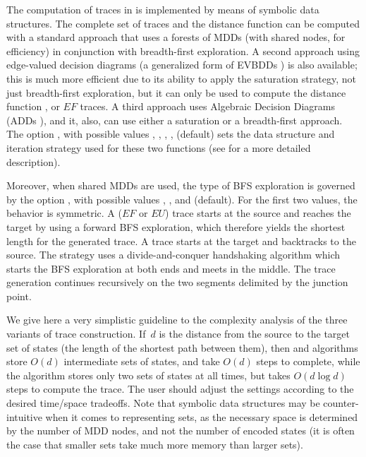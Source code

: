 \begin{developer}
The computation of traces in {\smart} is implemented by means of symbolic
data structures.
The complete set of traces and the distance function can
be computed with a standard approach that uses a forests of MDDs (with
shared nodes, for efficiency) in conjunction with breadth-first exploration.
A second approach using edge-valued decision diagrams (a generalized form
of EVBDDs \cite{Lai1996EVBDDs}) is also available;
this is much more efficient due to its ability to apply the saturation
strategy, not just breadth-first exploration, but it can only be used to
compute the distance function , or $EF$ traces.
A third approach uses Algebraic Decision Diagrams (ADDs \cite{Bahar1997ADDs}),
and it, also, can use either a saturation or a breadth-first approach.
The option , with possible
values , , ,
,  (default) sets the data structure and
iteration strategy used for these two functions
(see \cite{2002FMCAD-EVMDD} for a more detailed description).

Moreover, when shared MDDs are used, the type of BFS exploration is
governed by the option , with possible values
, , and  (default).
For the first two values, the behavior is symmetric.
A  ($EF$ or $EU$) trace starts at the source and reaches the
target by using a forward BFS exploration, which therefore yields the
shortest length for the generated trace.
A  trace starts at the target and backtracks to the source.
The  strategy uses a divide-and-conquer handshaking algorithm
which starts the BFS exploration at both ends and meets in the middle.
The trace generation continues recursively on the two segments
delimited by the junction point.

We give here a very simplistic guideline to the complexity analysis of the
three variants of trace construction. If~$d$ is the distance from the
source to the target set of states (the length of the shortest path
between them), then  and  algorithms store
$O(d)$ intermediate sets of states, and take $O(d)$ steps to complete,
while the  algorithm stores only two sets of states at all
times, but takes $O(d\log d)$ steps to compute the trace.
The user should adjust the settings according to the desired time/space
tradeoffs.
Note that symbolic data structures may be
counter-intuitive when it comes to representing sets, as the necessary
space is determined by the number of MDD nodes, and not the number of
encoded states (it is often the case that smaller sets take much more
memory than larger sets).
\end{developer}

